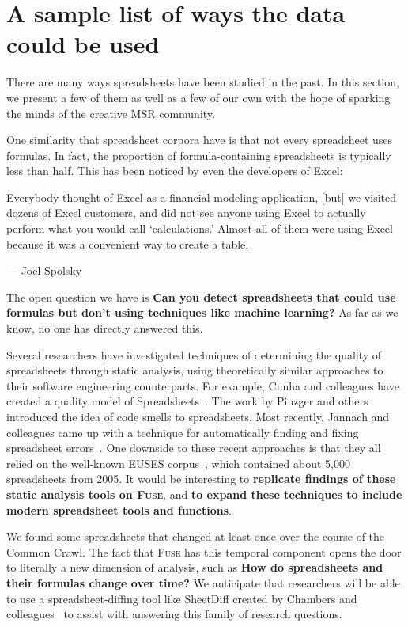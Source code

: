 \documentclass[conference]{IEEEtran}
\begin{document}
\section{A sample list of ways the data could be used}

There are many ways spreadsheets have been studied in the past.  
In this section, we present a few of them as well as a few of our own with the hope of sparking the minds of the creative MSR community.

One similarity that spreadsheet corpora have is that not every spreadsheet uses formulas.  
In fact, the proportion of formula-containing spreadsheets is typically less than half.
This has been noticed by even the developers of Excel:
\begin{displayquote}
Everybody thought of Excel as a financial modeling application, [but] we visited dozens of Excel customers, and did not see anyone using Excel to actually perform what you would call `calculations.' Almost all of them were using Excel because it was a convenient way to create a table.

 --- Joel Spolsky~\cite{JoelOnSoftware}
\end{displayquote}
The open question we have is \textbf{Can you detect spreadsheets that could use formulas but don't using techniques like machine learning?}
As far as we know, no one has directly answered this.

Several researchers have investigated techniques of determining the quality of spreadsheets through static analysis, using theoretically similar approaches to their software engineering counterparts.
For example, Cunha and colleagues have created a quality model of Spreadsheets~\cite{Cunha2012}.
The work by Pinzger and others introduced the idea of code smells to spreadsheets\cite{Pinzger2012}.
Most recently, Jannach and colleagues came up with a technique for automatically finding and fixing spreadsheet errors~\cite{jannach2014}.
One downside to these recent approaches is that they all relied on the well-known EUSES corpus~\cite{Fisher2005}, which contained about 5,000 spreadsheets from 2005.
It would be interesting to \textbf{replicate findings of these static analysis tools on \textsc{Fuse}}, and \textbf{to expand these techniques to include modern spreadsheet tools and functions}.

We found some spreadsheets that changed at least once over the course of the Common Crawl.
The fact that \textsc{Fuse} has this temporal component opens the door to literally a new dimension of analysis, such as \textbf{How do spreadsheets and their formulas change over time?}
We anticipate that researchers will be able to use a spreadsheet-diffing tool like SheetDiff created by Chambers and colleagues~\cite{chambers2010} to assist with answering this family of research questions.
\end{document}
